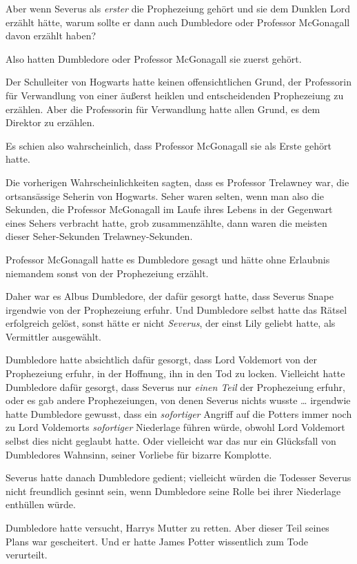 {Aber wenn Severus als \emph{erster} die Prophezeiung gehört und sie dem Dunklen Lord erzählt hätte, warum sollte er dann auch Dumbledore oder Professor McGonagall davon erzählt haben?

Also hatten Dumbledore oder Professor McGonagall sie zuerst gehört.

Der Schulleiter von Hogwarts hatte keinen offensichtlichen Grund, der Professorin für Verwandlung von einer äußerst heiklen und entscheidenden Prophezeiung zu erzählen. Aber die Professorin für Verwandlung hatte allen Grund, es dem Direktor zu erzählen.

Es schien also wahrscheinlich, dass Professor McGonagall sie als Erste gehört hatte.

Die vorherigen Wahrscheinlichkeiten sagten, dass es Professor Trelawney war, die ortsansässige Seherin von Hogwarts. Seher waren selten, wenn man also die Sekunden, die Professor McGonagall im Laufe ihres Lebens in der Gegenwart eines Sehers verbracht hatte, grob zusammenzählte, dann waren die meisten dieser Seher-Sekunden Trelawney-Sekunden.

Professor McGonagall hatte es Dumbledore gesagt und hätte ohne Erlaubnis niemandem sonst von der Prophezeiung erzählt.

Daher war es Albus Dumbledore, der dafür gesorgt hatte, dass Severus Snape irgendwie von der Prophezeiung erfuhr. Und Dumbledore selbst hatte das Rätsel erfolgreich gelöst, sonst hätte er nicht \emph{Severus}, der einst Lily geliebt hatte, als Vermittler ausgewählt.

Dumbledore hatte absichtlich dafür gesorgt, dass Lord Voldemort von der Prophezeiung erfuhr, in der Hoffnung, ihn in den Tod zu locken. Vielleicht hatte Dumbledore dafür gesorgt, dass Severus nur \emph{einen Teil} der Prophezeiung erfuhr, oder es gab andere Prophezeiungen, von denen Severus nichts wusste … irgendwie hatte Dumbledore gewusst, dass ein \emph{sofortiger} Angriff auf die Potters immer noch zu Lord Voldemorts \emph{sofortiger} Niederlage führen würde, obwohl Lord Voldemort selbst dies nicht geglaubt hatte. Oder vielleicht war das nur ein Glücksfall von Dumbledores Wahnsinn, seiner Vorliebe für bizarre Komplotte.

Severus hatte danach Dumbledore gedient; vielleicht würden die Todesser Severus nicht freundlich gesinnt sein, wenn Dumbledore seine Rolle bei ihrer Niederlage enthüllen würde.

Dumbledore hatte versucht, Harrys Mutter zu retten. Aber dieser Teil seines Plans war gescheitert. Und er hatte James Potter wissentlich zum Tode verurteilt.

}

